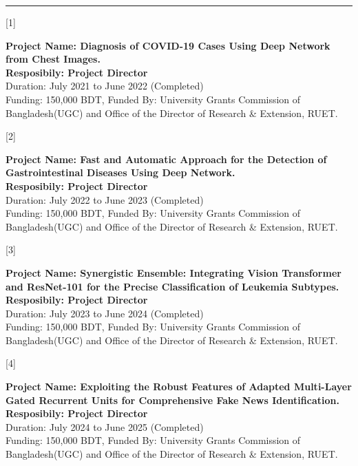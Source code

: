 \documentclass[a4paper,10pt]{article}
\newlength{\cvcolumngapwidth}
\newlength{\cvleftcolumnwidth}
\newlength{\cvrightcolumnwidth}
\newcommand{\cvsectionstyle}[1]{{\normalsize\cvsectionfont\textcolor{cvsectioncolor}{#1}}}
\newcommand{\cvheadingstyle}[1]{{\normalsize\cvheadingfont\textcolor{cvheadingcolor}{#1}}}
\newlength{\cvafteritemskipamount}
\newlength{\cvaftersectionskipamount}
\newlength{\cvparskip}
\newcommand{\cvsection}[1]{
    \begin{minipage}[t]{\cvleftcolumnwidth}
        \raggedleft\cvsectionstyle{#1}
    \end{minipage}%
    \hspace{\cvcolumngapwidth}%
    \begin{minipage}[t]{\cvrightcolumnwidth}
        \textcolor{cvrulecolor}{\rule{\cvrightcolumnwidth}{0.3mm}}
    \end{minipage}

    \vspace{\cvaftersectionskipamount}
}
\newcommand{\cvitem}[2]{
    \begin{minipage}[t]{\cvleftcolumnwidth}
        \raggedleft #1
    \end{minipage}%
    \hspace{\cvcolumngapwidth}%
    \begin{minipage}[t]{\cvrightcolumnwidth}
        \setlength{\parskip}{\cvparskip} #2
    \end{minipage}

    \vspace{\cvafteritemskipamount}
}
\begin{document}
\cvsection{FUNDED PROJECTS}
\cvitem{
    \cvheadingstyle{[1]}
}{
    \textbf{Project Name: Diagnosis of COVID-19 Cases Using Deep Network from Chest Images.}\\
    \textbf{Resposibily: Project Director}\\
    Duration: July 2021 to June 2022 (Completed)\\
    Funding: 150,000 BDT, Funded By: University Grants Commission of Bangladesh(UGC) and Office of the Director of Research \& Extension, RUET.
}
\cvitem{
    \cvheadingstyle{[2]}
}{
    \textbf{Project Name: Fast and Automatic Approach for the Detection of Gastrointestinal Diseases Using Deep Network.}\\
    \textbf{Resposibily: Project Director}\\
    Duration: July 2022 to June 2023 (Completed)\\
    Funding: 150,000 BDT, Funded By: University Grants Commission of Bangladesh(UGC) and Office of the Director of Research \& Extension, RUET.
}
\cvitem{
    \cvheadingstyle{[3]}
}{
    \textbf{Project Name: Synergistic Ensemble: Integrating Vision Transformer and ResNet-101 for the Precise Classification of Leukemia Subtypes.}\\
    \textbf{Resposibily: Project Director}\\
    Duration: July 2023 to June 2024 (Completed)\\
    Funding: 150,000 BDT, Funded By: University Grants Commission of Bangladesh(UGC) and Office of the Director of Research \& Extension, RUET.
}
\cvitem{
    \cvheadingstyle{[4]}
}{
    \textbf{Project Name: Exploiting the Robust Features of Adapted Multi-Layer Gated Recurrent Units for Comprehensive Fake News Identification.}\\
    \textbf{Resposibily: Project Director}\\
    Duration: July 2024 to June 2025 (Completed)\\
    Funding: 150,000 BDT, Funded By: University Grants Commission of Bangladesh(UGC) and Office of the Director of Research \& Extension, RUET.
}
\end{document}
